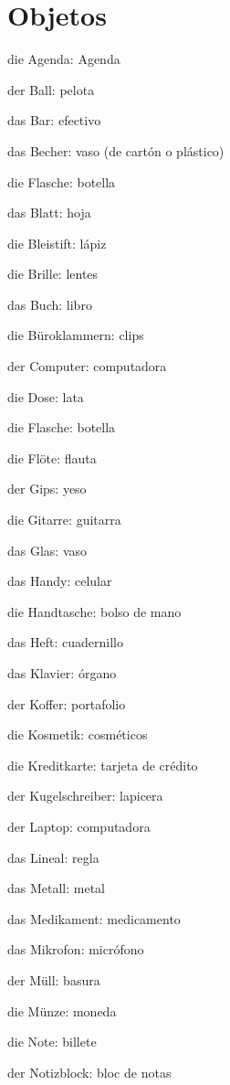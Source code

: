 \section{Objetos}
\begin{multicols}{3}
\begin{myitemize}
\item die Agenda: Agenda
\item der Ball: pelota
\item das Bar: efectivo
\item das Becher: vaso (de cartón o plástico)
\item die Flasche: botella
\item das Blatt: hoja
\item die Bleistift: lápiz
\item die Brille: lentes
\item das Buch: libro
\item die Büroklammern: clips
\item der Computer: computadora
\item die Dose: lata
\item die Flasche: botella
\item die Flöte: flauta
\item der Gips: yeso
\item die Gitarre: guitarra
\item das Glas: vaso
\item das Handy: celular
\item die Handtasche: bolso de mano
\item das Heft: cuadernillo
\item das Klavier: órgano
\item der Koffer: portafolio
\item die Kosmetik: cosméticos
\item die Kreditkarte: tarjeta de crédito
\item der Kugelschreiber: lapicera
\item der Laptop: computadora
\item das Lineal: regla
\item das Metall: metal
\item das Medikament: medicamento
\item das Mikrofon: micrófono
\item der Müll: basura
\item die Münze: moneda
\item die Note: billete
\item der Notizblock: bloc de notas

\end{myitemize}
\end{multicols}
